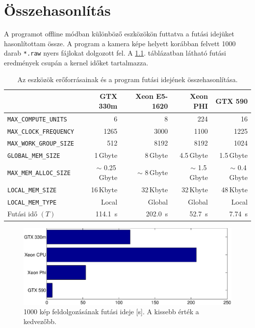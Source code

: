 \chapter{Összehasonlítás}

	A programot offline módban különböző eszközökön futtatva a futási idejüket hasonlítottam össze.
	A program a kamera képe helyett korábban felvett 1000 darab \texttt{*.raw} nyers fájlokat dolgozott fel.
	A \ref{table:results}. táblázatban látható futási eredmények csupán a kernel időket tartalmazza.
	
	\begin{table}[H]
	\footnotesize
	\centering
	
	\setlength{\extrarowheight}{3pt}
	\begin{tabular}{ l | r | r | r | r}
		 & GTX 330m & Xeon E5-1620 & Xeon PHI & GTX 590\\ \hline
		\texttt{MAX\_COMPUTE\_UNITS} & 6 & 8 & 224 & 16\\
		\texttt{MAX\_CLOCK\_FREQUENCY} & 1265 & 3000 & 1100 & 1225\\
		\texttt{MAX\_WORK\_GROUP\_SIZE} & 512 & 8192 & 8192 & 1024\\ \hline\hline
		\texttt{GLOBAL\_MEM\_SIZE} & 1\,Gbyte & 8\,Gbyte & 4.5\,Gbyte & 1.5\,Gbyte\\
		\texttt{MAX\_MEM\_ALLOC\_SIZE} & $\sim$ 0.25\,Gbyte & $\sim$ 8\,Gbyte & $\sim$ 1.5\,Gbyte & $\sim$ 0.4\,Gbyte\\
		\texttt{LOCAL\_MEM\_SIZE} & 16\,Kbyte & 32\,Kbyte & 32\,Kbyte & 48\,Kbyte\\
		\texttt{LOCAL\_MEM\_TYPE} & Local & Global & Global & Local\\\hline
		Futási idő $(T)$ & 114.1~s & 202.0~s & 52.7~s & 7.74~s
	\end{tabular}
	
	\caption[Különböző eszközök futási idejének összehasonlítása]{Az eszközök erőforrásainak és a program futási idejének összehasonlítása.}
	\label{table:results}
	\end{table}
	
	\begin{figure}[!h]
	\begin{center}
	  \includegraphics[width=0.9\columnwidth]{figures/eps/runtime.eps}
	  \caption{1000 kép feldolgozásának futási ideje [s]. A kissebb érték a kedvezőbb.}
	  \label{fig:runtime}
	\end{center}
	\end{figure}
	
